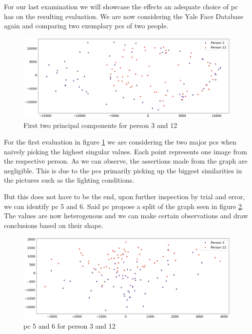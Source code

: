 For our last examination we will showcase the effects an adequate choice of \acrlong{pc} has on the resulting evaluation.
We are now considering the Yale Face Database again and comparing two exemplary \glspl{pc} of two people.

\begin{center}
    \begin{figure}[h]
      \centering
      \includegraphics[width=0.9\linewidth]{external_content/media/choice_of_pc/p3_12-pc1_2-centered.png}
      \captionsetup{justification=centering}
      \caption{First two principal components for person 3 and 12}
      \label{fig:pcIandII}
    \end{figure}
\end{center}

\vspace{-8mm}
For the first evaluation in figure \ref{fig:pcIandII} we are considering the two major \glspl{pc} when naively picking the highest singular values.
Each point represents one image from the respective person.
As we can observe, the assertions made from the graph are negligible.
This is due to the \glspl{pc} primarily picking up the biggest similarities in the pictures such as the lighting conditions.

But this does not have to be the end, upon further inspection by trial and error, we can identify \gls{pc} 5 and 6.
Said \gls{pc} propose a split of the graph seen in figure \ref{fig:pcVandVI}.
The values are now heterogenous and we can make certain observations and draw conclusions based on their shape.

\begin{center}
    \begin{figure}[h]
      \centering
      \includegraphics[width=0.9\linewidth]{external_content/media/choice_of_pc/p3_12-pc5_6-centered.png}
      \captionsetup{justification=centering}
      \caption{\gls{pc} 5 and 6 for person 3 and 12}
      \label{fig:pcVandVI}
    \end{figure}
\end{center}

